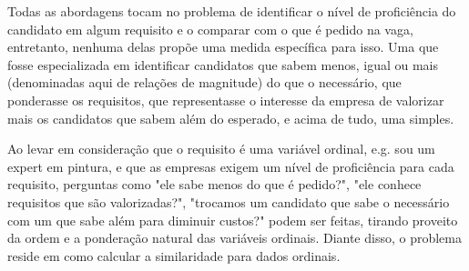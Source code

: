 \documentclass[preprint,12pt]{elsarticle}
\begin{document}




Todas as abordagens tocam no problema de identificar o nível de proficiência do candidato em algum requisito e o comparar com o que é pedido na vaga, entretanto, nenhuma delas propõe uma medida específica para isso. Uma que fosse especializada em identificar candidatos que sabem menos, igual ou mais (denominadas aqui de relações de magnitude) do que o necessário, que ponderasse os requisitos, que representasse o interesse da empresa de valorizar mais os candidatos que sabem além do esperado, e acima de tudo, uma simples.




Ao levar em consideração que o requisito é uma variável ordinal, e.g. sou um expert em pintura, e que as empresas exigem um nível de proficiência para cada requisito, perguntas como "ele sabe menos do que é pedido?", "ele conhece requisitos que são valorizadas?", "trocamos um candidato que sabe o necessário com um que sabe além para diminuir custos?" podem ser feitas, tirando proveito da ordem e a ponderação natural das variáveis ordinais. Diante disso, o problema reside em como calcular a similaridade para dados ordinais.


\end{document}
